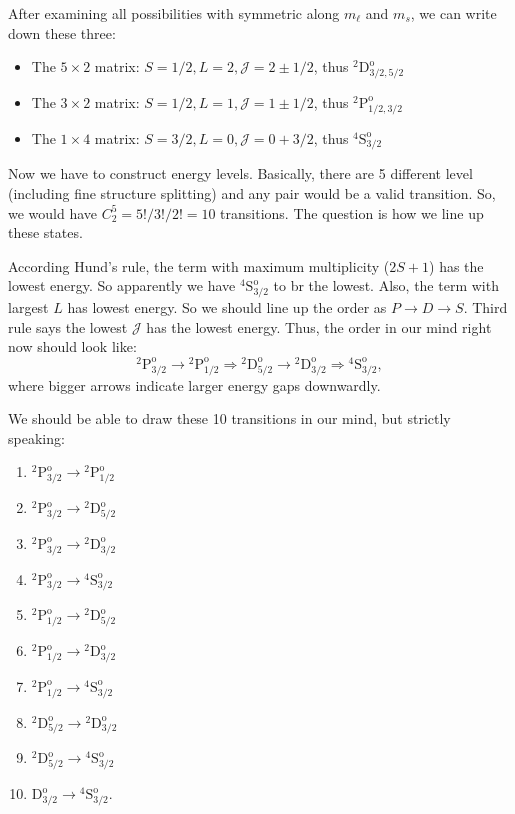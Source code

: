 \documentclass[12pt,letterpaper]{article}
\newcommand{\mt}{\mathrm}
\newcommand{\ml}{m_{\ell}}
\begin{document}
After examining all possibilities with symmetric along $\ml$ and $m_s$, we can write down these three:
\begin{itemize}
    \item The $5\times 2$ matrix: $S = 1/2, L = 2, \mathcal{J} = 2 \pm 1/2$, thus $^2{\mt D}^{\mt o}_{3/2,5/2}$
    \item The $3\times2$ matrix: $S = 1/2, L = 1, \mathcal{J}= 1 \pm 1/2$, thus $^2\mt{P}^{\mt o}_{1/2,3/2}$
    \item The $1\times4$ matrix: $S=3/2, L = 0, \mathcal{J} = 0 + 3/2$, thus $^4{\mt S}^{\mt o}_{3/2}$
\end{itemize} 

Now we have to construct energy levels.
Basically, there are 5 different level (including fine structure splitting) and any pair would be a valid transition.
So, we would have $C^5_2 = 5!/3!/2! = 10$ transitions.
The question is how we line up these states.

According Hund's rule, the term with maximum multiplicity ($2S + 1$) has the lowest energy.
So apparently we have $^4{\mt S}^{\mt o}_{3/2}$ to br the lowest.
Also, the term with largest $L$ has lowest energy.
So we should line up the order as $P \rightarrow D \rightarrow S$.
Third rule says the lowest $\mathcal{J}$ has the lowest energy.
Thus, the order in our mind right now should look like:
\begin{equation*}
    {^2}\mt{P}^{\mt o}_{3/2} \rightarrow {^2}\mt{P}^{\mt o}_{1/2} 
    \Rightarrow {^2}{\mt D}^{\mt o}_{5/2} \rightarrow {^2}{\mt D}^{\mt o}_{3/2} 
    \Rightarrow {^4}{\mt S}^{\mt o}_{3/2},
\end{equation*}
where bigger arrows indicate larger energy gaps downwardly.

We should be able to draw these 10 transitions in our mind, but strictly speaking:
\begin{enumerate}
    \item ${^2}\mt{P}^{\mt o}_{3/2} \rightarrow {^2}\mt{P}^{\mt o}_{1/2}$
    \item ${^2}\mt{P}^{\mt o}_{3/2} \rightarrow {^2}{\mt D}^{\mt o}_{5/2}$
    \item ${^2}\mt{P}^{\mt o}_{3/2} \rightarrow {^2}{\mt D}^{\mt o}_{3/2}$
    \item ${^2}\mt{P}^{\mt o}_{3/2} \rightarrow {^4}{\mt S}^{\mt o}_{3/2}$
    \item $ {^2}\mt{P}^{\mt o}_{1/2} \rightarrow {^2}{\mt D}^{\mt o}_{5/2}$
    \item ${^2}\mt{P}^{\mt o}_{1/2} \rightarrow {^2}{\mt D}^{\mt o}_{3/2} $
    \item $ {^2}\mt{P}^{\mt o}_{1/2} \rightarrow {^4}{\mt S}^{\mt o}_{3/2}$
    \item $ {^2}{\mt D}^{\mt o}_{5/2} \rightarrow {^2}{\mt D}^{\mt o}_{3/2} $ 
    \item $ {^2}{\mt D}^{\mt o}_{5/2} \rightarrow {^4}{\mt S}^{\mt o}_{3/2} $
    \item $ {\mt D}^{\mt o}_{3/2} \rightarrow {^4}{\mt S}^{\mt o}_{3/2} $.
\end{enumerate}
\end{document}
